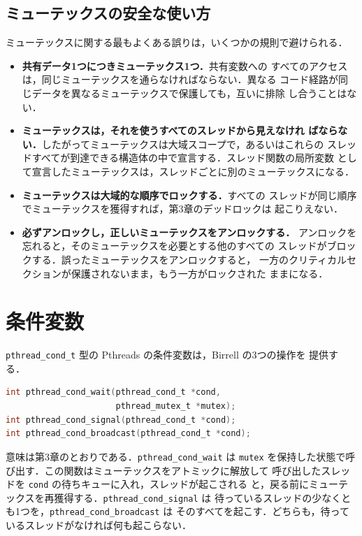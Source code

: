 \documentclass[../main.tex]{subfiles}
\begin{document}
\subsection{ミューテックスの安全な使い方}

ミューテックスに関する最もよくある誤りは，いくつかの規則で避けられる．
\begin{itemize}
  \item \textbf{共有データ1つにつきミューテックス1つ．}共有変数への
    すべてのアクセスは，同じミューテックスを通らなければならない．異なる
    コード経路が同じデータを異なるミューテックスで保護しても，互いに排除
    し合うことはない．
  \item \textbf{ミューテックスは，それを使うすべてのスレッドから見えなけれ
    ばならない．}したがってミューテックスは大域スコープで，あるいはこれらの
    スレッドすべてが到達できる構造体の中で宣言する．スレッド関数の局所変数
    として宣言したミューテックスは，スレッドごとに別のミューテックスになる．
  \item \textbf{ミューテックスは大域的な順序でロックする．}すべての
    スレッドが同じ順序でミューテックスを獲得すれば，第3章のデッドロックは
    起こりえない．
  \item \textbf{必ずアンロックし，正しいミューテックスをアンロックする．}%
    アンロックを忘れると，そのミューテックスを必要とする他のすべての
    スレッドがブロックする．誤ったミューテックスをアンロックすると，
    一方のクリティカルセクションが保護されないまま，もう一方がロックされた
    ままになる．
\end{itemize}

\section{条件変数}
\label{sec:l04-condvar}

\texttt{pthread\_cond\_t} 型の Pthreads の条件変数は，Birrell の3つの操作を
提供する．%
\begin{lstlisting}[language=C, numbers=none]
int pthread_cond_wait(pthread_cond_t *cond,
                      pthread_mutex_t *mutex);
int pthread_cond_signal(pthread_cond_t *cond);
int pthread_cond_broadcast(pthread_cond_t *cond);
\end{lstlisting}
意味は第3章のとおりである．\texttt{pthread\_cond\_wait} は \texttt{mutex}
を保持した状態で呼び出す．この関数はミューテックスをアトミックに解放して
呼び出したスレッドを \texttt{cond} の待ちキューに入れ，スレッドが起こされる
と，戻る前にミューテックスを再獲得する．\texttt{pthread\_cond\_signal} は
待っているスレッドの少なくとも1つを，\texttt{pthread\_cond\_broadcast} は
そのすべてを起こす．どちらも，待っているスレッドがなければ何も起こらない．%
%
\end{document}
